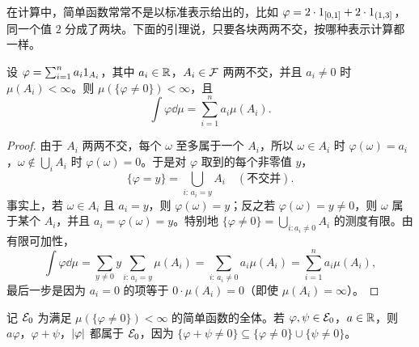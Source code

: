 在计算中，简单函数常常不是以标准表示给出的，比如 $\varphi=2\cdot1_{[0,1]}+2\cdot1_{(1,3]}$，同一个值 $2$ 分成了两块。下面的引理说，只要各块两两不交，按哪种表示计算都一样。

\begin{lemma}\label{lem:integration:representation}
设 $\varphi=\sum_{i=1}^na_i1_{A_i}$，其中 $a_i\in\mathbb{R}$，$A_i\in\mathcal{F}$ 两两不交，并且 $a_i\neq0$ 时 $\mu(A_i)<\infty$。则 $\mu(\{\varphi\neq0\})<\infty$，且
\[
\int\varphi\dd\mu=\sum_{i=1}^na_i\mu(A_i).
\]
\end{lemma}
\begin{proof}
由于 $A_i$ 两两不交，每个 $\omega$ 至多属于一个 $A_i$，所以 $\omega\in A_i$ 时 $\varphi(\omega)=a_i$，$\omega\notin\bigcup_iA_i$ 时 $\varphi(\omega)=0$。于是对 $\varphi$ 取到的每个非零值 $y$，
\[
\{\varphi=y\}=\bigcup_{i:\,a_i=y}A_i\quad(\text{不交并}).
\]
事实上，若 $\omega\in A_i$ 且 $a_i=y$，则 $\varphi(\omega)=y$；反之若 $\varphi(\omega)=y\neq0$，则 $\omega$ 属于某个 $A_i$，并且 $a_i=\varphi(\omega)=y$。特别地 $\{\varphi\neq0\}=\bigcup_{i:a_i\neq0}A_i$ 的测度有限。由有限可加性，
\[
\int\varphi\dd\mu=\sum_{y\neq0}y\sum_{i:\,a_i=y}\mu(A_i)=\sum_{i:\,a_i\neq0}a_i\mu(A_i)=\sum_{i=1}^na_i\mu(A_i),
\]
最后一步是因为 $a_i=0$ 的项等于 $0\cdot\mu(A_i)=0$（即使 $\mu(A_i)=\infty$）。
\end{proof}

记 $\mathcal{E}_0$ 为满足 $\mu(\{\varphi\neq0\})<\infty$ 的简单函数的全体。若 $\varphi,\psi\in\mathcal{E}_0$，$a\in\mathbb{R}$，则 $a\varphi$，$\varphi+\psi$，$\lvert \varphi\rvert$ 都属于 $\mathcal{E}_0$，因为 $\{\varphi+\psi\neq0\}\subseteq\{\varphi\neq0\}\cup\{\psi\neq0\}$。

